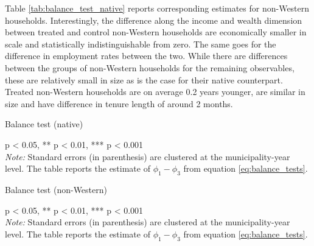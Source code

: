 \documentclass[main.tex]{subfiles}
\begin{document}
Table \ref{tab:balance_test_native} reports corresponding estimates for non-Western households. Interestingly, the difference along the income and wealth dimension between treated and control non-Western households are economically smaller in scale and statistically indistinguishable from zero. The same goes for the difference in employment rates between the two. While there are differences between the groups of non-Western households for the remaining observables, these are relatively small in size as is the case for their native counterpart. Treated non-Western households are on average 0.2 years younger, are similar in size and have difference in tenure length of around 2 months.  

\begin{table}[H]
    \centering
    \caption{Balance test (native)}
    \resizebox{\textwidth}{!}{}
    \label{tab:balance_test_native}
    \begin{tablenotes}[flushleft]
\item \scriptsize * p < 0.05, ** p < 0.01, *** p < 0.001 \\ \textit{Note:} Standard errors (in parenthesis) are clustered at the municipality-year level. The table reports the estimate of $\phi_1 - \phi_3$ from equation \ref{eq:balance_tests}. 
\end{tablenotes}
\end{table}

\begin{table}[H]
    \centering
    \caption{Balance test (non-Western)}
    \resizebox{\textwidth}{!}{}
    \label{tab:balance_test_non_west}
    \begin{tablenotes}[flushleft]
\item \scriptsize * p < 0.05, ** p < 0.01, *** p < 0.001 \\ \textit{Note:} Standard errors (in parenthesis) are clustered at the municipality-year level. The table reports the estimate of $\phi_1 - \phi_3$ from equation \ref{eq:balance_tests}. 
\end{tablenotes}
\end{table}
\end{document}
